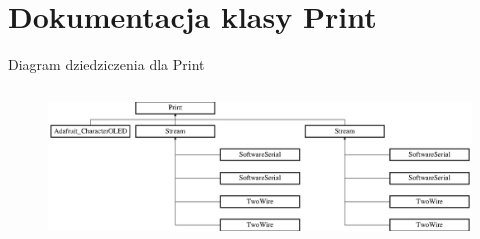 \hypertarget{class_print}{}\section{Dokumentacja klasy Print}
\label{class_print}
Diagram dziedziczenia dla Print\begin{figure}[H]
\begin{center}
\leavevmode
\includegraphics[height=4.122699cm]{class_print}
\end{center}
\end{figure}
